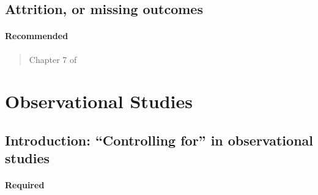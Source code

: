 \documentclass[12pt]{article}
\begin{document}
\begin{verse}  \end{verse}

\begin{verse}  \end{verse}

\begin{verse}  \end{verse}

\subsection{Attrition, or missing outcomes}

\paragraph*{Recommended}

\begin{verse} Chapter 7 of  \end{verse}

\begin{verse}  \end{verse}

\begin{verse}  \end{verse}

\begin{verse}  \end{verse}

\begin{verse}  \end{verse}

\section{Observational Studies}

\subsection{Introduction:  ``Controlling for'' in observational studies}

\paragraph*{Required}
\end{document}
